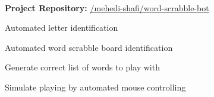  \\

\vspace{\topsep}
{\bf Project Repository: }\href{https://github.com/mehedi-shafi/word-scrabble-bot}{\github/mehedi-shafi/word-scrabble-bot}
\vspace{\topsep}

\begin{tightitemize}

\item Automated letter identification
\item Automated word scrabble board identification
\item Generate correct list of words to play with
\item Simulate playing by automated mouse controlling

\end{tightitemize}

\sectionspace